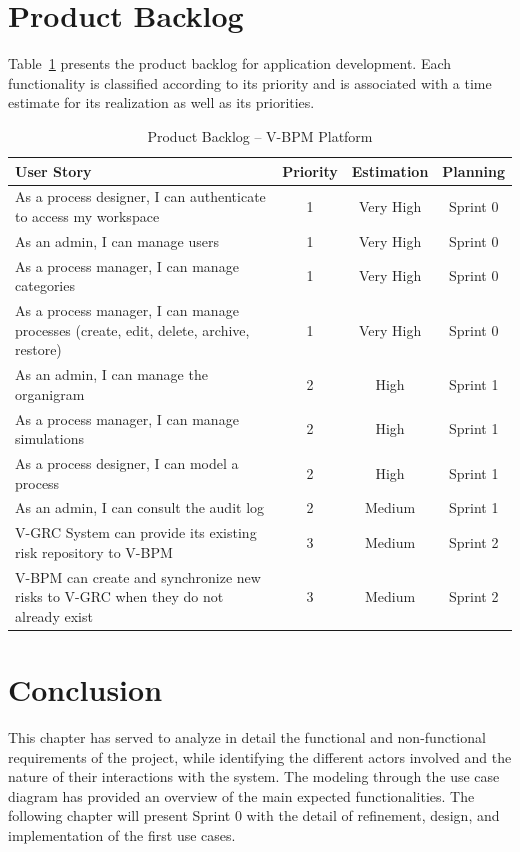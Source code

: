 \section{Product Backlog}

Table~\ref{tab:backlog-global} presents the product backlog for application development. Each functionality is classified according to its priority and is associated with a time estimate for its realization as well as its priorities.

\begin{table}[H]
\centering
\caption{Product Backlog -- V-BPM Platform}
\label{tab:backlog-global}
\begin{tabular}{|p{8cm}|c|c|c|}
\hline
\textbf{User Story} & \textbf{Priority} & \textbf{Estimation} & \textbf{Planning} \\
\hline
As a process designer, I can authenticate to access my workspace & 1 & Very High & Sprint 0 \\
\hline
As an admin, I can manage users & 1 & Very High & Sprint 0 \\
\hline
As a process manager, I can manage categories & 1 & Very High & Sprint 0 \\
\hline
As a process manager, I can manage processes (create, edit, delete, archive, restore) & 1 & Very High & Sprint 0 \\
\hline
As an admin, I can manage the organigram & 2 & High & Sprint 1 \\
\hline
As a process manager, I can manage simulations & 2 & High & Sprint 1 \\
\hline
As a process designer, I can model a process & 2 & High & Sprint 1 \\
\hline
As an admin, I can consult the audit log & 2 & Medium & Sprint 1 \\
\hline
V-GRC System can provide its existing risk repository to V-BPM & 3 & Medium & Sprint 2 \\
\hline
V-BPM can create and synchronize new risks to V-GRC when they do not already exist & 3 & Medium & Sprint 2 \\
\hline
\end{tabular}
\end{table}

\section{Conclusion}

This chapter has served to analyze in detail the functional and non-functional requirements of the project, while identifying the different actors involved and the nature of their interactions with the system. The modeling through the use case diagram has provided an overview of the main expected functionalities. The following chapter will present Sprint 0 with the detail of refinement, design, and implementation of the first use cases.
